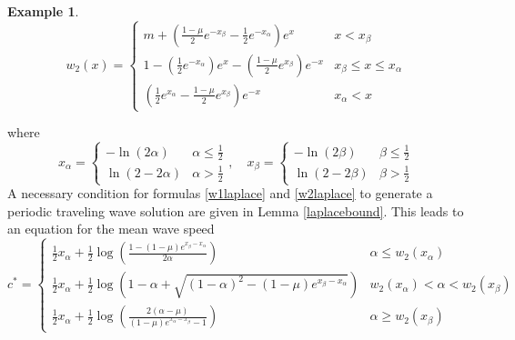 \documentclass[11pt]{article}
\theoremstyle{definition}
\newtheorem{ex}[thm]{Example}
\numberwithin{equation}{section}
\numberwithin{thm}{section}
\renewcommand{\a}{\alpha}
\renewcommand{\b}{\beta}
\newcommand{\m}{\mu}
\begin{document}
\begin{ex}
\begin{equation} \label{w2laplace}
w_2(x) = \begin{cases}
m + \left( \frac{1-\m}{2}e^{-x_\b} - \frac{1}{2}e^{-x_\a} \right) e^x & x < x_\b \\
1 - \left( \frac{1}{2} e^{-x_\a} \right) e^x - \left( \frac{1-\m}{2} e^{x_\b} \right)  e^{-x} & x_\b \leq x \leq x_\a \\
\left( \frac{1}{2} e^{x_\a} - \frac{1-\m}{2} e^{x_\b} \right) e^{-x} & x_\a < x 
\end{cases} \end{equation}

where
\begin{equation}
x_\a = \begin{cases} -\ln(2\a) & \a\leq \frac{1}{2} \\ \ln(2-2\a) & \a > \frac{1}{2} \end{cases}, \quad
x_\b = \begin{cases} -\ln(2\b) & \b\leq \frac{1}{2} \\ \ln(2-2\b) & \b > \frac{1}{2} \end{cases} 
\end{equation}
A necessary condition for formulas \eqref{w1laplace} and \eqref{w2laplace} to generate a periodic traveling wave solution are given in Lemma \ref{laplacebound}. This leads to an equation for the mean wave speed
\begin{equation}
c^* = \begin{cases}
\frac{1}{2}x_\a  + \frac{1}{2}\log \left( \frac{1 - (1-\m) e^{x_\b-x_\a}}{2\a} \right) & \a \leq w_2(x_\a) \\
\frac{1}{2}x_\a + \frac{1}{2} \log \left( 1-\a + \sqrt{(1-\a)^2 - (1-\mu) e^{x_\b-x_\a}} \right) & w_2(x_\a) < \a < w_2(x_\b) \\
\frac{1}{2}x_\a + \frac{1}{2} \log \left( \frac{2(\a-\m)}{(1-\m)e^{x_\a-x_\b}-1} \right) & \a \geq w_2(x_\b)
\end{cases} 
\end{equation}
%

\end{ex}
\end{document}
